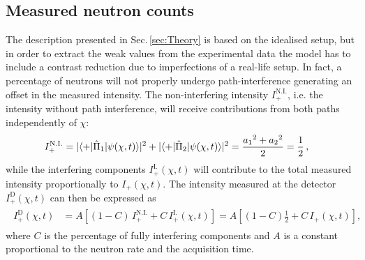 \documentclass[12pt]{iopart}
\newcommand{\sect}{Sec.}
\begin{document}
\subsection{Measured neutron counts}
The description presented in \sect\,\ref{sec:Theory} is based on the idealised setup, but in order to extract the weak values from the experimental data the model has to include a contrast reduction due to imperfections of a real-life setup. In fact, a percentage of neutrons will not properly undergo path-interference generating an offset in the measured intensity. The non-interfering intensity $I_+^{\mathrm{N.I.}}$, i.e. the intensity without path interference, will receive contributions from both paths independently of $\chi$:
\begin{align}
\begin{aligned}
    I_+^{\mathrm{N.I.}} &= \lvert \braket{+|\hat{\Pi}_1|\psi(\chi,t)} \rvert^2 + \lvert \braket{+|\hat{\Pi}_2|\psi(\chi,t)} \rvert^2 = \frac{{a_1}^2+{a_2}^2}{2} = \dfrac{1}{2}\, ,
\end{aligned}
\end{align}
while the interfering components $I_+^{\mathrm{I.}}(\chi,t)$ will contribute to the total measured intensity proportionally to $I_+(\chi,t)$. The intensity measured at the detector $I^{\mathrm{D}}_+(\chi, t)$ can then be expressed as
\begin{align}
\begin{aligned}
        I^{\mathrm{D}}_+(\chi, t) &= A\left[(1-C)\,I_+^{\mathrm{N.I.}}+C\,I_+^{\mathrm{I.}}(\chi,t)\right] = A\left[(1-C)\frac{1}{2} + C \, I_+(\chi,t)\right]  ,
    \label{eq:N}
\end{aligned}
\end{align}
where $C$ is the percentage of fully interfering components and $A$ is a constant proportional to the neutron rate and the acquisition time. 
\end{document}
